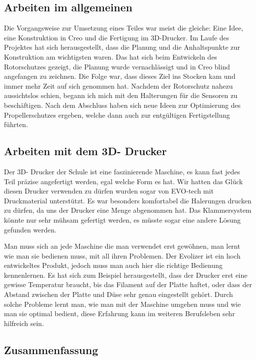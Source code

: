 	\subsection{Arbeiten im allgemeinen}

	Die Vorgangsweise zur Umsetzung eines Teiles war meist die gleiche: Eine Idee, eine Konstruktion in Creo und die Fertigung im 3D-Drucker.
	Im Laufe des Projektes hat sich herausgestellt, dass die Planung und die Anhaltspunkte zur Konstruktion am wichtigsten waren.
	Das hat sich beim Entwickeln des Rotorschutzes gezeigt, die Planung wurde vernachlässigt und in Creo blind angefangen zu zeichnen.
	Die Folge war, dass dieses Ziel ins Stocken kam und immer mehr Zeit auf sich genommen hat.
	Nachdem der Rotorschutz nahezu aussichtslos schien, begann ich mich mit den Halterungen für die Sensoren zu beschäftigen.
	Nach dem Abschluss haben sich neue Ideen zur Optimierung des Propellerschutzes ergeben, welche dann auch zur entgültigen Fertigstellung führten.

	\subsection{Arbeiten mit dem 3D- Drucker}

	Der 3D- Drucker der Schule ist eine faszinierende Maschine, es kann fast jedes Teil präzise angefertigt werden, egal welche Form es hat.
	Wir hatten das Glück diesen Drucker verwenden zu dürfen \bzw wurden sogar von EVO-tech mit Druckmaterial unterstützt.
	Es war besonders komfortabel die Halerungen drucken zu dürfen, da uns der Drucker eine Menge abgenommen hat.
	Das Klammersystem könnte nur sehr mühsam gefertigt werden, es müsste sogar eine andere Lösung gefunden werden.

	Man muss sich an jede Maschine die man verwendet erst gewöhnen, man lernt wie man sie bedienen muss, mit all ihren Problemen.
	Der Evolizer ist ein hoch entwickeltes Produkt, jedoch muss man auch hier die richtige Bedienung kennenlernen.
	Es hat sich zum Beispiel herausgestellt, dass der Drucker erst eine gewisse Temperatur braucht, bis das Filament auf der Platte haftet, oder dass der Abstand zwischen der Platte und Düse sehr genau eingestellt gehört.
	Durch solche Probleme lernt man, wie man mit der Maschine umgehen muss und wie man sie optimal bedient, diese Erfahrung kann im weiteren Berufsleben sehr hilfreich sein.

	\subsection{Zusammenfassung}

